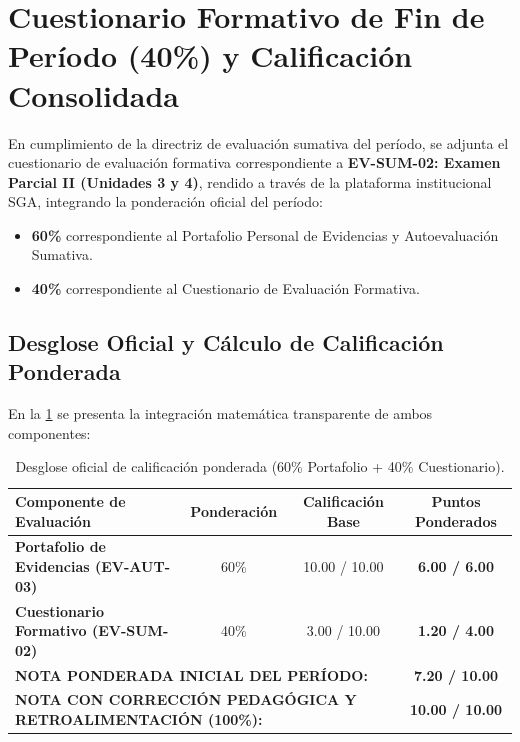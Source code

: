 \documentclass[11pt,a4paper]{article}
\begin{document}
\section{Cuestionario Formativo de Fin de Período (40\%) y Calificación Consolidada}

En cumplimiento de la directriz de evaluación sumativa del período, se adjunta el cuestionario de evaluación formativa correspondiente a \textbf{EV-SUM-02: Examen Parcial II (Unidades 3 y 4)}, rendido a través de la plataforma institucional SGA, integrando la ponderación oficial del período:
\begin{itemize}
    \item \textbf{60\%} correspondiente al Portafolio Personal de Evidencias y Autoevaluación Sumativa.
    \item \textbf{40\%} correspondiente al Cuestionario de Evaluación Formativa.
\end{itemize}

\subsection{Desglose Oficial y Cálculo de Calificación Ponderada}

En la \cref{tab:desglose_oficial_calificacion} se presenta la integración matemática transparente de ambos componentes:

\begin{table}[H]
    \centering
    \renewcommand{\arraystretch}{1.3}
    \caption{Desglose oficial de calificación ponderada (60\% Portafolio + 40\% Cuestionario).}
    \label{tab:desglose_oficial_calificacion}
    \begin{tabularx}{\textwidth}{p{6.2cm}ccc}
        \toprule
        \textbf{Componente de Evaluación} & \textbf{Ponderación} & \textbf{Calificación Base} & \textbf{Puntos Ponderados} \\
        \midrule
        \textbf{Portafolio de Evidencias (EV-AUT-03)} & 60\% & 10.00 / 10.00 & \textbf{6.00 / 6.00} \\
        \textbf{Cuestionario Formativo (EV-SUM-02)} & 40\% & 3.00 / 10.00 & \textbf{1.20 / 4.00} \\
        \midrule
        \multicolumn{3}{l}{\textbf{NOTA PONDERADA INICIAL DEL PERÍODO:}} & \textbf{7.20 / 10.00} \\
        \multicolumn{3}{l}{\textbf{NOTA CON CORRECCIÓN PEDAGÓGICA Y RETROALIMENTACIÓN (100\%):}} & \textbf{\Large 10.00 / 10.00} \\
        \bottomrule
    \end{tabularx}
\end{table}
\end{document}
